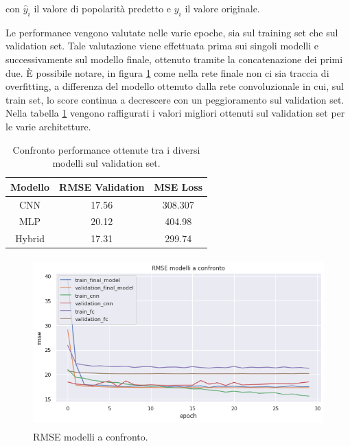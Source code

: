 con $\hat{y}_i$ il valore di popolarità predetto e $y_i$ il valore originale.


Le performance vengono valutate nelle varie epoche, sia sul training set che sul validation set. Tale valutazione viene effettuata prima sui singoli modelli e successivamente sul modello finale, ottenuto tramite la concatenazione dei primi due. È possibile notare, in figura \ref{fig:rmse-all} come nella rete finale non ci sia traccia di overfitting, a differenza del modello ottenuto dalla rete convoluzionale in cui, sul train set, lo score continua a decrescere con un peggioramento sul validation set. 
Nella tabella \ref{table:rmse} vengono raffigurati i valori migliori ottenuti sul validation set per le varie architetture.

\begin{table}[H]
\caption{Confronto performance ottenute tra i diversi modelli sul validation set.}
  \vspace{3mm}
\centering
\begin{tabular}{|c|c|c|}
\hline
\textbf{Modello} & \textbf{RMSE Validation} & \textbf{MSE Loss} \\ \hline \hline
CNN     & 17.56           & 308.307  \\ \hline 
MLP     & 20.12           & 404.98   \\ \hline 
Hybrid  & 17.31           & 299.74   \\ \hline
\end{tabular}
\label{table:rmse}
\end{table}

\vspace{1cm}

\begin{figure}[h]
    \centering
    \includegraphics[width=13cm, height=6.5cm]{Plot/ALL_RMSE.png}
    \caption{RMSE modelli a confronto.}
    \label{fig:rmse-all}
\end{figure}



